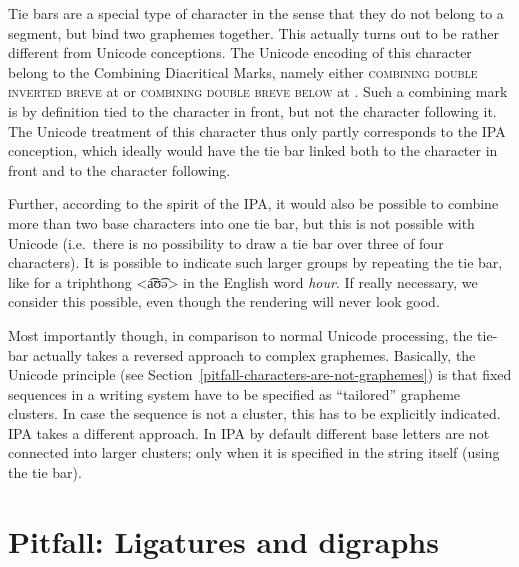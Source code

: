 Tie bars are a special type of character in the sense that they do not belong to
a segment, but bind two graphemes together. This actually turns out to be rather
different from Unicode conceptions. The Unicode encoding of this character
belong to the Combining Diacritical Marks, namely either \textsc{combining double
inverted breve} at  or \textsc{combining double breve below} at
. Such a combining mark is by definition tied to the character in
front, but not the character following it. The Unicode treatment of this
character thus only partly corresponds to the IPA conception, which ideally
would have the tie bar linked both to the character in front and to the
character following. 

Further, according to the spirit of the IPA, it would also be possible to
combine more than two base characters into one tie bar, but this is not possible
with Unicode (i.e.~there is no possibility to draw a tie bar over three of four
characters). It is possible to indicate such larger groups by repeating the tie
bar, like for a triphthong <a͡ʊ͡ə> in the English word \textit{hour}. If really
necessary, we consider this possible, even though the rendering will never look
good. 

Most importantly though, in comparison to normal Unicode processing, the tie-bar
actually takes a reversed approach to complex graphemes. Basically, the Unicode
principle (see Section~\ref{pitfall-characters-are-not-graphemes}) is that fixed
sequences in a writing system have to be specified as ``tailored'' grapheme
clusters. In case the sequence is not a cluster, this has to be explicitly
indicated. IPA takes a different approach. In IPA by default different base
letters are not connected into larger clusters; only when it is specified in the
string itself (using the tie bar).



\section{Pitfall: Ligatures and digraphs}
\label{pitfall-ligatures-digraphs}     


